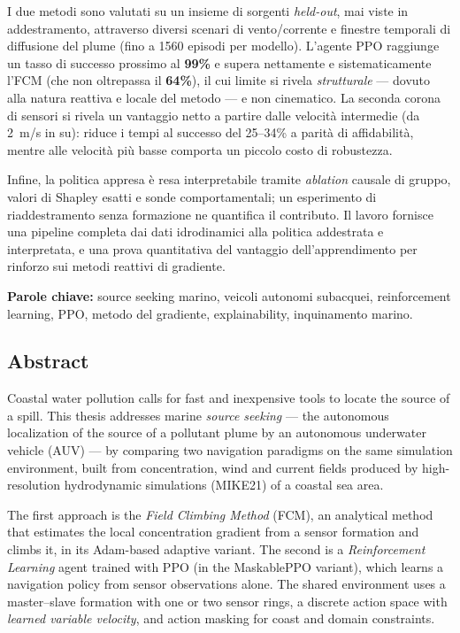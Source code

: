 \documentclass[12pt,a4paper]{article}
\begin{document}
I due metodi sono valutati su un insieme di sorgenti \emph{held-out}, mai viste in
addestramento, attraverso diversi scenari di vento/corrente e finestre temporali di
diffusione del plume (fino a 1560 episodi per modello). L'agente PPO raggiunge un tasso di successo
prossimo al \textbf{99\%} e supera nettamente e sistematicamente l'FCM (che non oltrepassa
il \textbf{64\%}), il cui limite si rivela \emph{strutturale} --- dovuto alla natura
reattiva e locale del metodo --- e non cinematico. La seconda corona di sensori si rivela un
vantaggio netto a partire dalle velocit\`a intermedie (da 2~m/s in su): riduce i tempi al
successo del 25--34\% a parit\`a di affidabilit\`a, mentre alle velocit\`a pi\`u basse
comporta un piccolo costo di robustezza.

Infine, la politica appresa \`e resa interpretabile tramite \emph{ablation} causale di
gruppo, valori di Shapley esatti e sonde comportamentali; un esperimento di riaddestramento
senza formazione ne quantifica il contributo. Il lavoro fornisce una pipeline completa dai
dati idrodinamici alla politica addestrata e interpretata, e una prova quantitativa del
vantaggio dell'apprendimento per rinforzo sui metodi reattivi di gradiente.

\medskip
\noindent\textbf{Parole chiave:} source seeking marino, veicoli autonomi subacquei,
reinforcement learning, PPO, metodo del gradiente, explainability, inquinamento marino.

\vspace{3mm}
\subsection*{Abstract}

Coastal water pollution calls for fast and inexpensive tools to locate the source of a
spill. This thesis addresses marine \emph{source seeking} --- the autonomous localization of
the source of a pollutant plume by an autonomous underwater vehicle (AUV) --- by comparing
two navigation paradigms on the same simulation environment, built from concentration, wind
and current fields produced by high-resolution hydrodynamic simulations (MIKE21) of a
coastal sea area.

The first approach is the \emph{Field Climbing Method} (FCM), an analytical method that
estimates the local concentration gradient from a sensor formation and climbs it, in its
Adam-based adaptive variant. The second is a \emph{Reinforcement Learning} agent trained
with PPO (in the MaskablePPO variant), which learns a navigation policy from sensor
observations alone. The shared environment uses a master--slave formation with one or two
sensor rings, a discrete action space with \emph{learned variable velocity}, and action
masking for coast and domain constraints.
\end{document}

